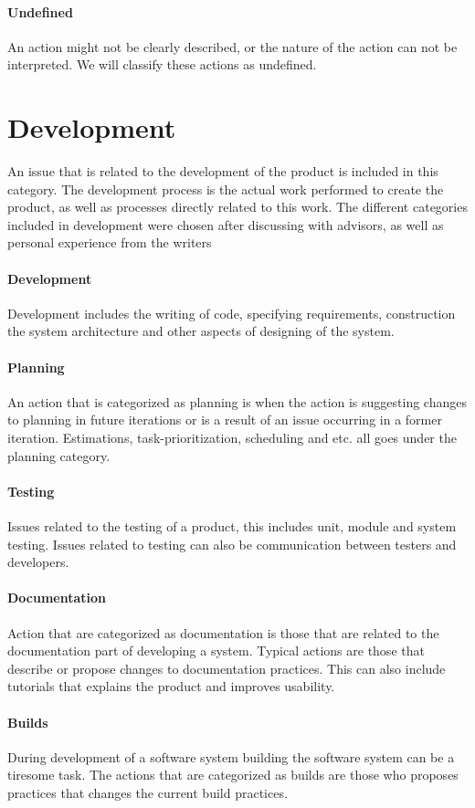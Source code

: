 \paragraph{Undefined}
An action might not be clearly described, or the nature of the action can not be interpreted. We will classify these actions as undefined.

\section{Development}
An issue that is related to the development of the product is included in this category. The development process is the actual work performed to create the product, as well as processes directly related to this work. The different categories included in development were chosen after discussing with advisors, as well as personal experience from the writers
\paragraph{Development}
Development includes the writing of code, specifying requirements, construction the system architecture and other aspects of designing of the system. 
\paragraph{Planning}
An action that is categorized as planning is when the action is suggesting changes to planning in future iterations or is a result of an issue occurring in a former iteration. Estimations, task-prioritization, scheduling and etc. all goes under the planning category.
\paragraph{Testing}
Issues related to the testing of a product, this includes unit, module and system testing. Issues related to testing can also be communication between testers and developers.
\paragraph{Documentation}
Action that are categorized as documentation is those that are related to the documentation part of developing a system. Typical actions are those that describe or propose changes to documentation practices. This can also include tutorials that explains the product and improves usability. 
\paragraph{Builds}
During development of a software system building the software system can be a tiresome task. The actions that are categorized as builds are those who proposes practices that changes the current build practices.
